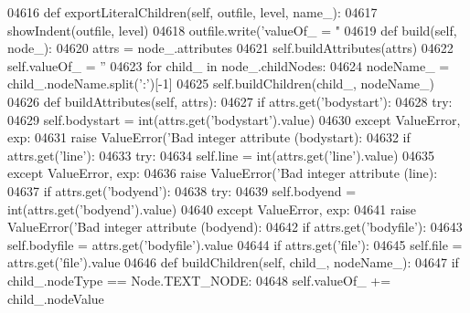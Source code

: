 \begin{DoxyCode}
{{{{{{{{{{{{{{{{{{{{{{{{{{{{{{{{{{{{{{{{{{{{{{{{{{{{{{{{{{{{{{{{{{{{{{{{{{{{{{{{{{{{{{{{{{{{{{{{{{{{{{{{{{{{{{{{{{{{{{{{{{{{{{{{{{{{{{{{{{{{{{{{{{{{{{{{{{{{{{{{{{{{{{{{{{{{{{{{{{{{{{{{{{{{{{{{{{{{{{{{{{{{{{{{{{{{{{{{{{{{{{{{{{{{{{{{{{{{{{{{{{{{{{{{{{{{{{{{{{{{{{{{{{{{{{{{{{{{{{{{{{{{{{{{{{{{{{{{{{{{{{{{{{{{{{{{{{{{04616     \textcolor{keyword}{def }exportLiteralChildren(self, outfile, level, name\_):
04617         showIndent(outfile, level)
04618         outfile.write(\textcolor{stringliteral}{'valueOf\_ = "%
04619     \textcolor{keyword}{def }build(self, node\_):
04620         attrs = node\_.attributes
04621         self.buildAttributes(attrs)
04622         self.valueOf_ = \textcolor{stringliteral}{''}
04623         \textcolor{keywordflow}{for} child\_ \textcolor{keywordflow}{in} node\_.childNodes:
04624             nodeName\_ = child\_.nodeName.split(\textcolor{stringliteral}{':'})[-1]
04625             self.buildChildren(child\_, nodeName\_)
04626     \textcolor{keyword}{def }buildAttributes(self, attrs):
04627         \textcolor{keywordflow}{if} attrs.get(\textcolor{stringliteral}{'bodystart'}):
04628             \textcolor{keywordflow}{try}:
04629                 self.bodystart = int(attrs.get(\textcolor{stringliteral}{'bodystart'}).value)
04630             \textcolor{keywordflow}{except} ValueError, exp:
04631                 \textcolor{keywordflow}{raise} ValueError(\textcolor{stringliteral}{'Bad integer attribute (bodystart): %
04632         \textcolor{keywordflow}{if} attrs.get(\textcolor{stringliteral}{'line'}):
04633             \textcolor{keywordflow}{try}:
04634                 self.line = int(attrs.get(\textcolor{stringliteral}{'line'}).value)
04635             \textcolor{keywordflow}{except} ValueError, exp:
04636                 \textcolor{keywordflow}{raise} ValueError(\textcolor{stringliteral}{'Bad integer attribute (line): %
04637         \textcolor{keywordflow}{if} attrs.get(\textcolor{stringliteral}{'bodyend'}):
04638             \textcolor{keywordflow}{try}:
04639                 self.bodyend = int(attrs.get(\textcolor{stringliteral}{'bodyend'}).value)
04640             \textcolor{keywordflow}{except} ValueError, exp:
04641                 \textcolor{keywordflow}{raise} ValueError(\textcolor{stringliteral}{'Bad integer attribute (bodyend): %
04642         \textcolor{keywordflow}{if} attrs.get(\textcolor{stringliteral}{'bodyfile'}):
04643             self.bodyfile = attrs.get(\textcolor{stringliteral}{'bodyfile'}).value
04644         \textcolor{keywordflow}{if} attrs.get(\textcolor{stringliteral}{'file'}):
04645             self.file = attrs.get(\textcolor{stringliteral}{'file'}).value
04646     \textcolor{keyword}{def }buildChildren(self, child\_, nodeName\_):
04647         \textcolor{keywordflow}{if} child\_.nodeType == Node.TEXT\_NODE:
04648             self.valueOf_ += child\_.nodeValue
}}}}}}}}}}}}}}}}}}}}}}}}}}}}}}}}}}}}}}}}}}}}}}}}}}}}}}}}}}}}}}}}}}}}}}}}}}}}}}}}}}}}}}}}}}}}}}}}}}}}}}}}}}}}}}}}}}}}}}}}}}}}}}}}}}}}}}}}}}}}}}}}}}}}}}}}}}}}}}}}}}}}}}}}}}}}}}}}}}}}}}}}}}}}}}}}}}}}}}}}}}}}}}}}}}}}}}}}}}}}}}}}}}}}}}}}}}}}}}}}}}}}}}}}}}}}}}}}}}}}}}}}}}}}}}}}}}}}}}}}}}}}}}}}}}}}}}}}}}}}}}}}}}}}}}}}}}}}}}}}
\end{DoxyCode}
